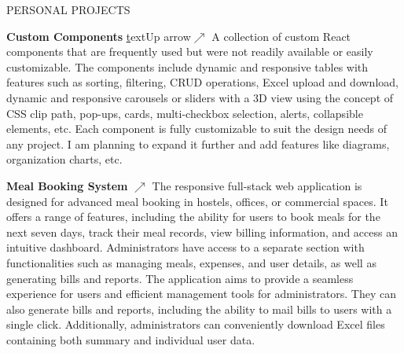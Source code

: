 \documentclass{res} %
\begin{document}

\begin{rSection}{PERSONAL PROJECTS}
\vspace{-1.25em}






\item \textbf{Custom Components}
\href{https://custom-components-orpin.vercel.app/}text{Up arrow}{\texorpdfstring{\(\nearrow\)}{nearrow}}
{A collection of custom React components that are frequently used but were not readily available or easily customizable. The components include dynamic and responsive tables with features such as sorting, filtering, CRUD operations, Excel upload and download, dynamic and responsive carousels or sliders with a 3D view using the concept of CSS clip path, pop-ups, cards, multi-checkbox selection, alerts, collapsible elements, etc. Each component is fully customizable to suit the design needs of any project. I am planning to expand it further and add features like diagrams, organization charts, etc.}



\item \textbf{Meal Booking System}
\href{https://meal-booking-system.vercel.app/}{\texorpdfstring{\(\nearrow\)}{nearrow}}
{
The responsive full-stack web application is designed for advanced meal booking in hostels, offices, or commercial spaces. It offers a range of features, including the ability for users to book meals for the next seven days, track their meal records, view billing information, and access an intuitive dashboard. Administrators have access to a separate section with functionalities such as managing meals, expenses, and user details, as well as generating bills and reports. The application aims to provide a seamless experience for users and efficient management tools for administrators. They can also generate bills and reports, including the ability to mail bills to users with a single click. Additionally, administrators can conveniently download Excel files containing both summary and individual user data.}






\end{rSection}
\end{document}
